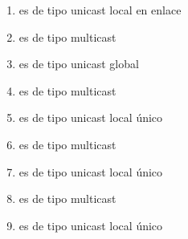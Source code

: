 \documentclass[letterpaper,10pt,spanish]{sphinxmanual}
\begin{document}
\begin{enumerate}
\item {} 
\sphinxAtStartPar
{} es de tipo unicast local en enlace

\item {} 
\sphinxAtStartPar
{} es de tipo multicast

\item {} 
\sphinxAtStartPar
{} es de tipo unicast global

\item {} 
\sphinxAtStartPar
{} es de tipo multicast

\item {} 
\sphinxAtStartPar
{} es de tipo unicast local único

\item {} 
\sphinxAtStartPar
{} es de tipo multicast

\item {} 
\sphinxAtStartPar
{} es de tipo unicast local único

\item {} 
\sphinxAtStartPar
{} es de tipo multicast

\item {} 
\sphinxAtStartPar
{} es de tipo unicast local único

\end{enumerate}



\renewcommand{\indexname}{Índice}
\printindex
\end{document}
